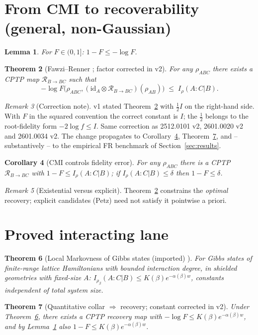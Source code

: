 \documentclass[11pt]{article}
\newtheorem{theorem}{Theorem}[section]
\newtheorem{lemma}[theorem]{Lemma}
\newtheorem{corollary}[theorem]{Corollary}
\theoremstyle{remark}
\newtheorem{remark}[theorem]{Remark}
\begin{document}
\section{From CMI to recoverability (general, non-Gaussian)}
\begin{lemma}
\label{lem:conv}
For $F \in (0,1]$: $1 - F \le -\log F$.
\end{lemma}
\begin{theorem}[Fawzi--Renner \cite{FR}; factor corrected in v2]
\label{thm:fr}
For any $\rho_{ABC}$ there exists a CPTP map $\mathcal{R}_{B\to BC}$ such
that
\[
-\log F\bigl(\rho_{ABC}, (\mathrm{id}_A \otimes \mathcal{R}_{B\to BC})
(\rho_{AB})\bigr) \;\le\; I_\rho(A:C|B).
\]
\end{theorem}
\begin{remark}[Correction note]
\label{rem:fix}
v1 stated Theorem~\ref{thm:fr} with $\tfrac12 I$ on the right-hand side.
With $F$ in the squared convention the correct constant is $I$; the
$\tfrac12$ belongs to the root-fidelity form $-2\log f \le I$. Same
correction as 2512.0101 v2, 2601.0020 v2 and 2601.0034 v2. The change
propagates to Corollary~\ref{cor:fid}, Theorem~\ref{thm:bridge}, and --
substantively -- to the empirical FR benchmark of
Section~\ref{sec:results}.
\end{remark}
\begin{corollary}[CMI controls fidelity error]
\label{cor:fid}
For any $\rho_{ABC}$ there is a CPTP $\mathcal{R}_{B\to BC}$ with
$1 - F \le I_\rho(A:C|B)$; if $I_\rho(A:C|B) \le \delta$ then $1 - F \le
\delta$.
\end{corollary}
\begin{remark}[Existential versus explicit]
Theorem~\ref{thm:fr} constrains the \emph{optimal} recovery; explicit
candidates (Petz) need not satisfy it pointwise a priori.
\end{remark}

\section{Proved interacting lane}
\begin{theorem}[Local Markovness of Gibbs states (imported) \cite{CR}]
\label{thm:cr}
For Gibbs states of finite-range lattice Hamiltonians with bounded
interaction degree, in shielded geometries with fixed-size $A$:
$I_{\rho_\beta}(A:C|B) \le K(\beta) e^{-\alpha(\beta) w}$, constants
independent of total system size.
\end{theorem}
\begin{theorem}[Quantitative collar $\Rightarrow$ recovery; constant
corrected in v2]
\label{thm:bridge}
Under Theorem~\ref{thm:cr}, there exists a CPTP recovery map with
$-\log F \le K(\beta)e^{-\alpha(\beta)w}$, and by Lemma~\ref{lem:conv}
also $1 - F \le K(\beta)e^{-\alpha(\beta)w}$.
\end{theorem}
\end{document}
